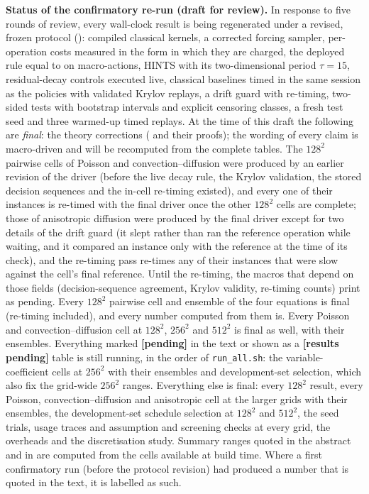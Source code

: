 \documentclass{article}
\begin{document}
{\noindent\textbf{Status of the confirmatory re-run (draft for review).} In response to five rounds of review, every wall-clock result is being regenerated under a revised, frozen protocol (): compiled classical kernels, a corrected forcing sampler, per-operation costs measured in the form in which they are charged, the deployed rule equal to  on macro-actions, HINTS with its two-dimensional period $\tau = 15$, residual-decay controls executed live, classical baselines timed in the same session as the policies with validated Krylov replays, a drift guard with re-timing, two-sided tests with bootstrap intervals and explicit censoring classes, a fresh test seed and three warmed-up timed replays. At the time of this draft the following are \emph{final}: the theory corrections ( and their proofs); the wording of every claim is macro-driven and will be recomputed from the complete tables. The $128^2$ pairwise cells of Poisson and convection--diffusion were produced by an earlier revision of the driver (before the live decay rule, the Krylov validation, the stored decision sequences and the in-cell re-timing existed), and every one of their instances is re-timed with the final driver once the other $128^2$ cells are complete; those of anisotropic diffusion were produced by the final driver except for two details of the drift guard (it slept rather than ran the reference operation while waiting, and it compared an instance only with the reference at the time of its check), and the re-timing pass re-times any of their instances that were slow against the cell's final reference. Until the re-timing, the macros that depend on those fields (decision-sequence agreement, Krylov validity, re-timing counts) print as pending. Every $128^2$ pairwise cell and ensemble of the four equations is final (re-timing included), and every number computed from them is. Every Poisson and convection--diffusion cell at $128^2$, $256^2$ and $512^2$ is final as well, with their ensembles. Everything marked \textbf{[pending]} in the text or shown as a \textbf{[results pending]} table is still running, in the order of \texttt{run\_all.sh}: the variable-coefficient cells at $256^2$ with their ensembles and development-set selection, which also fix the grid-wide $256^2$ ranges. Everything else is final: every $128^2$ result, every Poisson, convection--diffusion and anisotropic cell at the larger grids with their ensembles, the development-set schedule selection at $128^2$ and $512^2$, the seed trials, usage traces and assumption and screening checks at every grid, the overheads and the discretisation study. Summary ranges quoted in the abstract and in  are computed from the cells available at build time. Where a first confirmatory run (before the protocol revision) had produced a number that is quoted in the text, it is labelled as such.}
\end{document}
